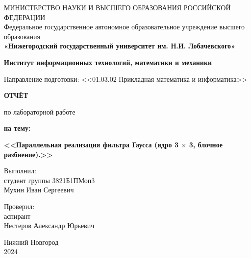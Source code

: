 \documentclass[12pt]{article}
\begin{document}
\begin{center}
    \large
    МИНИСТЕРСТВО НАУКИ И ВЫСШЕГО ОБРАЗОВАНИЯ РОССИЙСКОЙ ФЕДЕРАЦИИ \\
    Федеральное государственное автономное образовательное учреждение высшего образования \\
    \textbf{«Нижегородский государственный университет им. Н.И. Лобачевского»}

    \vspace{0.5cm}

    \textbf{Институт информационных технологий, математики и механики}
    
    \vspace{0.5cm}
    
    Направление подготовки: <<01.03.02 Прикладная математика и информатика>>

    \vspace{1.5cm}

    \textbf{ОТЧЁТ}

    по лабораторной работе

    \vspace{0.5cm}

    \textbf{на тему:}

    \textbf{<<Параллельная реализация фильтра Гаусса (ядро 3 $\times$ 3, блочное разбиение).>>}
\end{center}

\vspace{2.5cm}

\begin{flushright}
    Выполнил: \\
    студент группы 3821Б1ПМоп3 \\
    Мухин Иван Сергеевич

    \vspace{0.5cm}

    Проверил: \\
    аспирант \\
    Нестеров Александр Юрьевич
    
    \vspace{0.5cm}

\end{flushright}

\vfill

\begin{center}
    Нижний Новгород \\
    2024
\end{center}
\thispagestyle{empty}

\newpage
     
\end{document}
